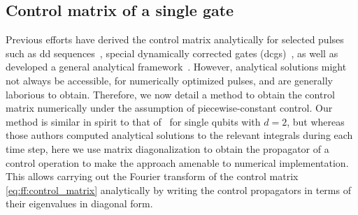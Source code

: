 \subsection{Control matrix of a single gate}\label{subsec:ff:theory:control_matrix:pulse}
Previous efforts have derived the control matrix analytically for selected pulses such as \gls{dd} sequences~\cite{Cywinski2008}, special dynamically corrected gates (\glspl{dcg})~\cite{Gungordu2018}, as well as developed a general analytical framework~\cite{Green2012,Green2013}.
However, analytical solutions might not always be accessible, \eg for numerically optimized pulses, and are generally laborious to obtain.
Therefore, we now detail a method to obtain the control matrix numerically under the assumption of piecewise-constant control.
Our method is similar in spirit to that of~\citet{Green2012} for single qubits with $d=2$, but whereas those authors computed analytical solutions to the relevant integrals during each time step, here we use matrix diagonalization to obtain the propagator of a control operation to make the approach amenable to numerical implementation.
This allows carrying out the Fourier transform of the control matrix \cref{eq:ff:control_matrix} analytically by writing the control propagators in terms of their eigenvalues in diagonal form.

